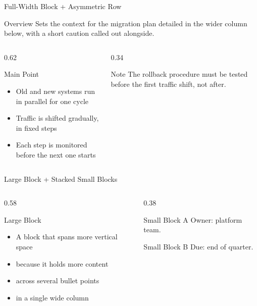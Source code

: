 \documentclass[aspectratio=169]{beamer}
\begin{document}
\begin{frame}{Full-Width Block + Asymmetric Row}
  \begin{block}{Overview}
    {\small Sets the context for the migration plan detailed in the
    wider column below, with a short caution called out alongside.}
  \end{block}
  \begin{columns}[T]
    \begin{column}{0.62\textwidth}
      \begin{block}{Main Point}
        \begin{itemize}
          \item Old and new systems run in parallel for one cycle
          \item Traffic is shifted gradually, in fixed steps
          \item Each step is monitored before the next one starts
        \end{itemize}
      \end{block}
    \end{column}
    \begin{column}{0.34\textwidth}
      \begin{alertblock}{Note}
        {\small The rollback procedure must be tested before the
        first traffic shift, not after.}
      \end{alertblock}
    \end{column}
  \end{columns}
\end{frame}

\begin{frame}{Large Block + Stacked Small Blocks}
  \begin{columns}[T]
    \begin{column}{0.58\textwidth}
      \begin{block}{Large Block}
        \begin{itemize}
          \item A block that spans more vertical space
          \item because it holds more content
          \item across several bullet points
          \item in a single wide column
        \end{itemize}
      \end{block}
    \end{column}
    \begin{column}{0.38\textwidth}
      \begin{block}{Small Block A}
        {\small Owner: platform team.}
      \end{block}
      \begin{block}{Small Block B}
        {\small Due: end of quarter.}
      \end{block}
    \end{column}
  \end{columns}
\end{frame}
\end{document}
